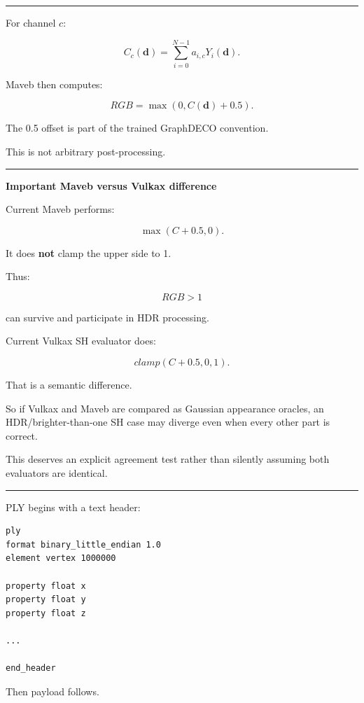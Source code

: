 \begin{center}\rule{0.5\linewidth}{0.5pt}\end{center}

For channel \(c\):

\[
C_c(\mathbf d)
=
\sum_{i=0}^{N-1}
a_{i,c}Y_i(\mathbf d).
\]

Maveb then computes:

\[
\boxed{
RGB=
\max(
0,
C(\mathbf d)+0.5
).
}
\]

The 0.5 offset is part of the trained GraphDECO convention.

This is not arbitrary post-processing.

\begin{center}\rule{0.5\linewidth}{0.5pt}\end{center}

\textbf{Important Maveb versus Vulkax difference}

Current Maveb performs:

\[
\max(C+0.5,0).
\]

It does \textbf{not} clamp the upper side to 1.

Thus:

\[
RGB>1
\]

can survive and participate in HDR processing.

Current Vulkax SH evaluator does:

\[
clamp(C+0.5,0,1).
\]

That is a semantic difference.

So if Vulkax and Maveb are compared as Gaussian appearance oracles, an HDR/brighter-than-one SH case may diverge even when every other part is correct.

This deserves an explicit agreement test rather than silently assuming both evaluators are identical.

\begin{center}\rule{0.5\linewidth}{0.5pt}\end{center}

PLY begins with a text header:

\protect{}\label{zw47bm}%
\begin{verbatim}
ply
format binary_little_endian 1.0
element vertex 1000000

property float x
property float y
property float z

...

end_header
\end{verbatim}

Then payload follows.

